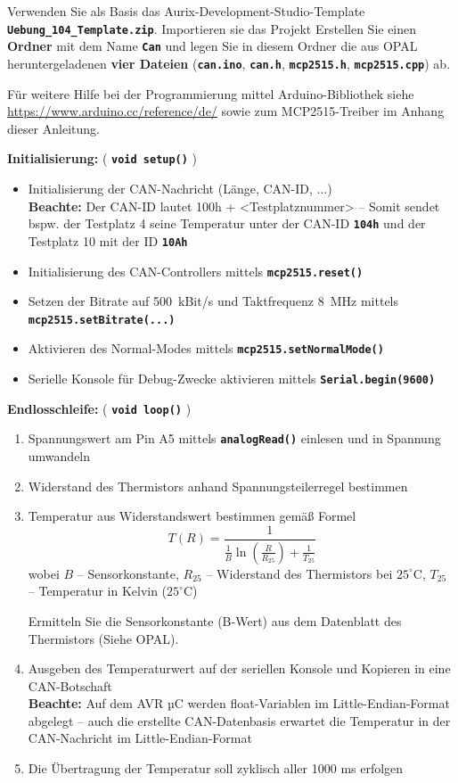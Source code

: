 \documentclass[
    fontsize=12pt,                      %
    paper=a4,                           %
    twoside=off,                       %
    DIV=15,                             %
    BCOR=12mm,                          %
    headings=normal,                    %
    headsepline=false,                   %
    footsepline=false,                  %
    headinclude=true,                   %
    footinclude=false,                  %
    toc=listof,                         %
    toc=bib,                            %
    chapterprefix=false,                %
    appendixprefix=false,               %
    numbers=noendperiod,                %
    captions=tableabove,                %
    footnotes=multiple,                 %
    bibliography=oldstyle,              %
    draft=false,                        %
]{scrreprt}
\newcommand{\Farbcode}[1]{\texttt{\textbf{\textcolor{myred}{#1}}}}
\begin{document}
Verwenden Sie als Basis das Aurix-Development-Studio-Template \Farbcode{Uebung\_104\_Template.zip}. Importieren sie das Projekt Erstellen Sie einen \textbf{Ordner} mit dem Name \Farbcode{Can} und legen Sie in diesem Ordner die aus OPAL heruntergeladenen \textbf{vier Dateien} (\Farbcode{can.ino}, \Farbcode{can.h}, \Farbcode{mcp2515.h}, \Farbcode{mcp2515.cpp}) ab.

Für weitere Hilfe bei der Programmierung mittel Arduino-Bibliothek siehe  \url{https://www.arduino.cc/reference/de/} sowie zum MCP2515-Treiber im Anhang dieser Anleitung.
\vskip 0.2cm

\noindent
\textbf{Initialisierung:} ( \Farbcode{void setup()} )
\begin{itemize}
\item Initialisierung der CAN-Nachricht (Länge, CAN-ID, ...) \\
\textbf{Beachte:} Der CAN-ID lautet 100h + <Testplatznummer> -- Somit sendet bspw. der Testplatz 4 seine Temperatur unter der CAN-ID \texttt{\textbf{104h}} und der Testplatz 10 mit der ID \texttt{\textbf{10Ah}}
\item Initialisierung des CAN-Controllers mittels \Farbcode{mcp2515.reset()}
\item Setzen der Bitrate auf 500~kBit/s und Taktfrequenz 8~MHz mittels \\ \Farbcode{mcp2515.setBitrate(...)}
\item Aktivieren des Normal-Modes mittels \Farbcode{mcp2515.setNormalMode()}
\item Serielle Konsole für Debug-Zwecke aktivieren mittels \Farbcode{Serial.begin(9600)}
\end{itemize}

\noindent
\textbf{Endlosschleife:} ( \Farbcode{void loop()} )
\begin{enumerate}
\item Spannungswert am Pin A5 mittels \Farbcode{analogRead()} einlesen und in Spannung umwandeln
\item Widerstand des Thermistors anhand Spannungsteilerregel bestimmen
\item Temperatur aus Widerstandswert bestimmen gemäß Formel
\begin{equation*}
T(R)=\frac{1}{\frac{1}{B}\ln(\frac{R}{R_{25}})+\frac{1}{T_{25}}} 
\end{equation*}
wobei $B$ -- Sensorkonstante, $R_{25}$ -- Widerstand des Thermistors bei $25^\circ$C, $T_{25}$ -- Temperatur in Kelvin ($25^\circ$C)

Ermitteln Sie die Sensorkonstante (B-Wert) aus dem Datenblatt des Thermistors (Siehe OPAL).
\item Ausgeben des Temperaturwert auf der seriellen Konsole und Kopieren in eine CAN-Botschaft \\
\textbf{Beachte:} Auf dem AVR µC werden float-Variablen im Little-Endian-Format abgelegt -- auch die erstellte CAN-Datenbasis erwartet die Temperatur in der CAN-Nachricht im Little-Endian-Format

\item Die Übertragung der Temperatur soll zyklisch aller 1000 ms erfolgen
\end{enumerate}
\newpage
\end{document}
